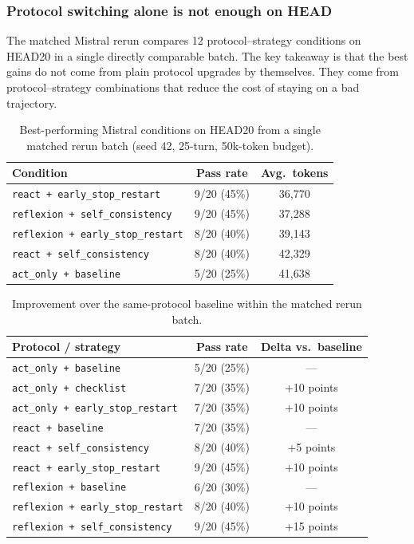 \documentclass{article}
\begin{document}
\subsubsection{Protocol switching alone is not enough on HEAD}

The matched Mistral rerun compares 12 protocol--strategy conditions on HEAD20 in a single directly comparable batch. The key takeaway is that the best gains do not come from plain protocol upgrades by themselves. They come from protocol--strategy combinations that reduce the cost of staying on a bad trajectory.

\begin{table}[t]
\centering
\caption{Best-performing Mistral conditions on HEAD20 from a single matched rerun batch (seed 42, 25-turn, 50k-token budget).}
\label{tab:protocols}
\begin{tabular}{lcc}
\toprule
Condition & Pass rate & Avg.\ tokens \\
\midrule
\texttt{react + early\_stop\_restart} & 9/20 (45\%) & 36{,}770 \\
\texttt{reflexion + self\_consistency} & 9/20 (45\%) & 37{,}288 \\
\texttt{reflexion + early\_stop\_restart} & 8/20 (40\%) & 39{,}143 \\
\texttt{react + self\_consistency} & 8/20 (40\%) & 42{,}329 \\
\texttt{act\_only + baseline} & 5/20 (25\%) & 41{,}638 \\
\bottomrule
\end{tabular}
\end{table}

\begin{table}[t]
\centering
\caption{Improvement over the same-protocol baseline within the matched rerun batch.}
\label{tab:protocoldelta}
\begin{tabular}{lcc}
\toprule
Protocol / strategy & Pass rate & Delta vs.\ baseline \\
\midrule
\texttt{act\_only + baseline} & 5/20 (25\%) & --- \\
\texttt{act\_only + checklist} & 7/20 (35\%) & +10 points \\
\texttt{act\_only + early\_stop\_restart} & 7/20 (35\%) & +10 points \\
\midrule
\texttt{react + baseline} & 7/20 (35\%) & --- \\
\texttt{react + self\_consistency} & 8/20 (40\%) & +5 points \\
\texttt{react + early\_stop\_restart} & 9/20 (45\%) & +10 points \\
\midrule
\texttt{reflexion + baseline} & 6/20 (30\%) & --- \\
\texttt{reflexion + early\_stop\_restart} & 8/20 (40\%) & +10 points \\
\texttt{reflexion + self\_consistency} & 9/20 (45\%) & +15 points \\
\bottomrule
\end{tabular}
\end{table}
\end{document}
